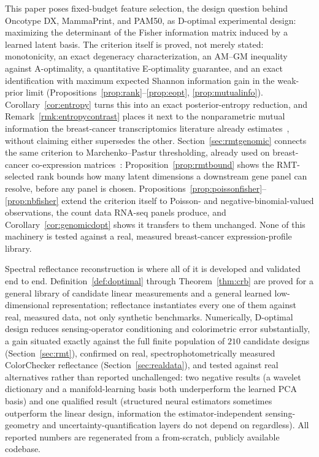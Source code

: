 \documentclass[11pt]{article}
\begin{document}
This paper poses fixed-budget feature selection, the design question behind Oncotype DX, MammaPrint, and PAM50, as D-optimal experimental design: maximizing the determinant of the Fisher information matrix induced by a learned latent basis. The criterion itself is proved, not merely stated: monotonicity, an exact degeneracy characterization, an AM--GM inequality against A-optimality, a quantitative E-optimality guarantee, and an exact identification with maximum expected Shannon information gain in the weak-prior limit (Propositions~\ref{prop:rank}--\ref{prop:eopt}, \ref{prop:mutualinfo}). Corollary~\ref{cor:entropy} turns this into an exact posterior-entropy reduction, and Remark~\ref{rmk:entropycontrast} places it next to the nonparametric mutual information the breast-cancer transcriptomics literature already estimates~\citep{ref29,ref49}, without claiming either supersedes the other. Section~\ref{sec:rmtgenomic} connects the same criterion to Marchenko--Pastur thresholding, already used on breast-cancer co-expression matrices~\citep{ref46}: Proposition~\ref{prop:rmtbound} shows the RMT-selected rank bounds how many latent dimensions a downstream gene panel can resolve, before any panel is chosen. Propositions~\ref{prop:poissonfisher}--\ref{prop:nbfisher} extend the criterion itself to Poisson- and negative-binomial-valued observations, the count data RNA-seq panels produce, and Corollary~\ref{cor:genomicdopt} shows it transfers to them unchanged. None of this machinery is tested against a real, measured breast-cancer expression-profile library.

Spectral reflectance reconstruction is where all of it is developed and validated end to end. Definition~\ref{def:doptimal} through Theorem~\ref{thm:crb} are proved for a general library of candidate linear measurements and a general learned low-dimensional representation; reflectance instantiates every one of them against real, measured data, not only synthetic benchmarks. Numerically, D-optimal design reduces sensing-operator conditioning and colorimetric error substantially, a gain situated exactly against the full finite population of $210$ candidate designs (Section~\ref{sec:rmt}), confirmed on real, spectrophotometrically measured ColorChecker reflectance (Section~\ref{sec:realdata}), and tested against real alternatives rather than reported unchallenged: two negative results (a wavelet dictionary and a manifold-learning basis both underperform the learned PCA basis) and one qualified result (structured neural estimators sometimes outperform the linear design, information the estimator-independent sensing-geometry and uncertainty-quantification layers do not depend on regardless). All reported numbers are regenerated from a from-scratch, publicly available codebase.
\end{document}

